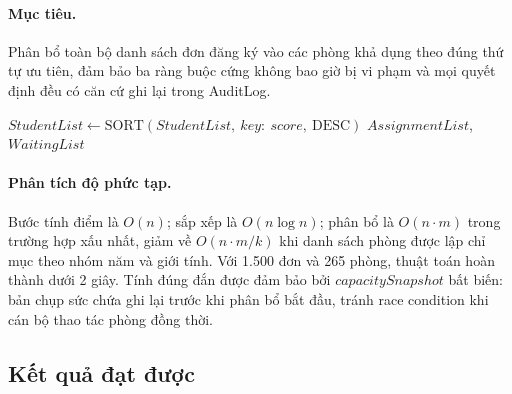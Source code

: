 \documentclass[../DoAn.tex]{subfiles}
\begin{document}
\begin{minipage}{\linewidth}
\paragraph{Mục tiêu.}
Phân bổ toàn bộ danh sách đơn đăng ký vào các phòng khả dụng theo đúng thứ
tự ưu tiên, đảm bảo ba ràng buộc cứng không bao giờ bị vi phạm và mọi quyết
định đều có căn cứ ghi lại trong AuditLog. \\

\begin{algorithm}[H]
\small
\caption{\textit{QuotaBasedRoomAllocation}}
$StudentList \leftarrow \text{SORT}(StudentList,\ key{:}\ score,\ \text{DESC})$\;
\KwReturn $AssignmentList$, $WaitingList$\;
\end{algorithm}
\end{minipage}

\medskip
\paragraph{Phân tích độ phức tạp.}
Bước tính điểm là $O(n)$; sắp xếp là $O(n \log n)$; phân bổ là $O(n \cdot m)$
trong trường hợp xấu nhất, giảm về $O(n \cdot m/k)$ khi danh sách phòng được
lập chỉ mục theo nhóm năm và giới tính. Với 1.500 đơn và 265 phòng, thuật toán
hoàn thành dưới 2 giây. Tính đúng đắn được đảm bảo bởi $capacitySnapshot$ bất
biến: bản chụp sức chứa ghi lại trước khi phân bổ bắt đầu, tránh race condition
khi cán bộ thao tác phòng đồng thời.

\subsection{Kết quả đạt được}
\label{subsec:alloc_result}
\end{document}
